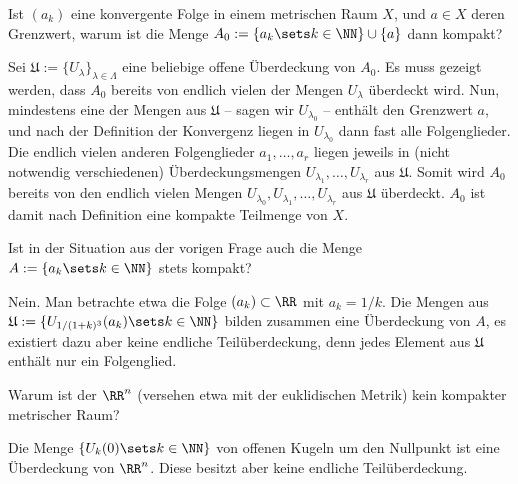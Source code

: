 \begin{frage}\label{09_kompaktbsp}
  Ist $(a_k)$ eine konvergente Folge in einem metrischen Raum $X$, 
  und $a\in X$ deren Grenzwert, warum ist die 
  Menge $A_0:=\{ a_k\sets k\in \NN \} \cup \{ a \}$ dann kompakt? 
\end{frage}

\begin{antwort}
  Sei $\mathfrak{U }:=\{ U_\lambda \}_{\lambda\in\Lambda}$ eine beliebige 
  offene Überdeckung von $A_0$. Es muss gezeigt werden, dass 
  $A_0$ bereits von endlich vielen der Mengen $U_\lambda$ überdeckt 
  wird. Nun, mindestens eine der Mengen aus $\mathfrak{U}$ -- sagen wir 
  $U_{\lambda_0}$ -- enthält den Grenzwert $a$, und nach der Definition 
  der Konvergenz liegen in $U_{\lambda_0}$ dann fast alle Folgenglieder. 
  Die endlich vielen anderen Folgenglieder $a_1,\ldots,a_r$ liegen 
  jeweils in (nicht notwendig verschiedenen) 
  Überdeckungsmengen $U_{\lambda_1},\ldots,U_{\lambda_r}$ aus $\mathfrak{U}$. 
  Somit wird $A_0$ bereits von den endlich vielen 
  Mengen  $U_{\lambda_0},U_{\lambda_1},\ldots,U_{\lambda_r}$ aus 
  $\mathfrak{U}$ überdeckt. $A_0$ ist damit nach Definition eine 
  kompakte Teilmenge von $X$. 
  \AntEnd 
\end{antwort} 

\begin{frage}
  Ist in der Situation aus der vorigen Frage auch die Menge  
  $A:=\{ a_k \sets k\in \NN \}$ stets kompakt?
\end{frage}

\begin{antwort}
  Nein. Man betrachte etwa die Folge $(a_k)\subset \RR$ 
  mit $a_k = 1/k$. Die Mengen aus 
  $\mathfrak{U}:=\{ U_{1/(1+k)^3} (a_k) \sets k\in \NN \}$ 
  bilden zusammen eine Überdeckung von $A$,  
  es existiert dazu aber keine endliche Teilüberdeckung, denn 
  jedes Element aus $\mathfrak{U}$ enthält nur ein Folgenglied. 
  \AntEnd  
  
\end{antwort}

\begin{frage}
  Warum ist der $\RR^n$ (versehen etwa mit der euklidischen Metrik) kein 
  kompakter metrischer Raum?
\end{frage}

\begin{antwort}
  Die Menge $\{ U_k (0 )\sets k \in \NN \}$ von offenen Kugeln 
  um den Nullpunkt ist eine Überdeckung von $\RR^n$. Diese besitzt aber 
  keine endliche Teilüberdeckung.
  \AntEnd
\end{antwort}

